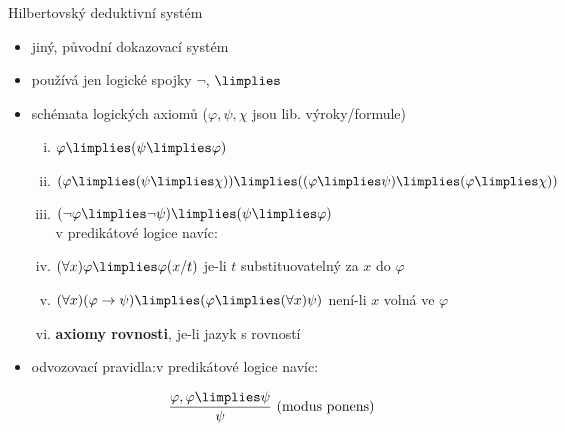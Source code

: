 \documentclass{beamer}
\begin{document}
\begin{frame}{Hilbertovský deduktivní systém}

    \pause
    \begin{itemize}
        \item jiný, původní dokazovací systém \pause
        \item používá jen logické spojky $\neg$, $\limplies$ \pause
        \item \alert{schémata logických axiomů} ($\varphi,\psi,\chi$ jsou lib. výroky/formule) \pause
        \begin{enumerate}[(i)]
            \item $\varphi \limplies (\psi \limplies \varphi)$\pause
            \item $(\varphi\limplies (\psi \limplies \chi))\limplies ((\varphi \limplies \psi)\limplies(\varphi \limplies \chi))$
            \item $(\neg \varphi \limplies \neg \psi)\limplies(\psi \limplies \varphi)$\\ \pause
            v predikátové logice navíc: \pause
            \item $(\forall x)\varphi \limplies \varphi(x/t)$ \hfill je-li $t$ substituovatelný za $x$ do $\varphi$ \pause
            \item $(\forall x)(\varphi \to \psi) \limplies (\varphi \limplies (\forall x)\psi)$ \hfill není-li $x$ volná ve $\varphi$ \pause
            \item \textbf{axiomy rovnosti}, je-li jazyk s rovností \pause
        \end{enumerate}

        \item \alert{odvozovací pravidla}:\hfill v predikátové logice navíc:
        \vspace{-6pt}
        \begin{center}
            \begin{minipage}{0.45\textwidth}
                $$
                \frac{\varphi, \varphi \limplies \psi}{\psi}\ \text{(modus ponens)}
                $$
            \end{minipage}          
            \begin{minipage}{0.45\textwidth}
            \end{minipage}            
        \end{center}      
        
    \end{itemize}

\end{frame}
\end{document}
